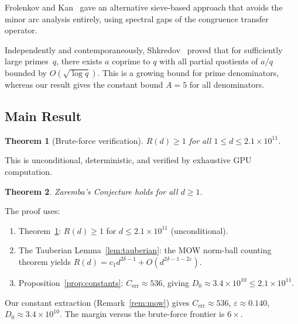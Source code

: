 \documentclass[11pt,a4paper]{amsart}
\newtheorem{theorem}{Theorem}
\theoremstyle{definition}
\begin{document}
Frolenkov and Kan~\cite{FK2014} gave an alternative sieve-based approach that avoids the minor arc analysis entirely, using spectral gaps of the congruence transfer operator.

Independently and contemporaneously, Shkredov~\cite{Shkredov2026} proved that for sufficiently large primes~$q$, there exists $a$ coprime to $q$ with all partial quotients of $a/q$ bounded by $O(\sqrt{\log q})$. This is a growing bound for prime denominators, whereas our result gives the constant bound $A=5$ for all denominators.

\subsection{Main Result}

\begin{theorem}[Brute-force verification]\label{thm:bruteforce}
$R(d) \geq 1$ for all $1 \leq d \leq 2.1 \times 10^{11}$.
\end{theorem}

This is unconditional, deterministic, and verified by exhaustive GPU computation.

\begin{theorem}\label{thm:effective}
Zaremba's Conjecture holds for all $d \geq 1$.
\end{theorem}

The proof uses:
\begin{enumerate}[label=(\roman*)]
\item Theorem~\ref{thm:bruteforce}: $R(d) \geq 1$ for $d \leq 2.1 \times 10^{11}$ (unconditional).
\item The Tauberian Lemma~\ref{lem:tauberian}: the MOW norm-ball counting theorem yields $R(d) = c_1 d^{2\delta-1} + O(d^{2\delta-1-2\varepsilon})$.
\item Proposition~\ref{prop:constants}: $C_{\text{err}} \approx 536$, giving $D_0 \approx 3.4 \times 10^{10} \leq 2.1 \times 10^{11}$.
\end{enumerate}

Our constant extraction (Remark~\ref{rem:mow}) gives $C_{\text{err}} \approx 536$, $\varepsilon \approx 0.140$, $D_0 \approx 3.4 \times 10^{10}$. The margin versus the brute-force frontier is $6\times$.
\end{document}
